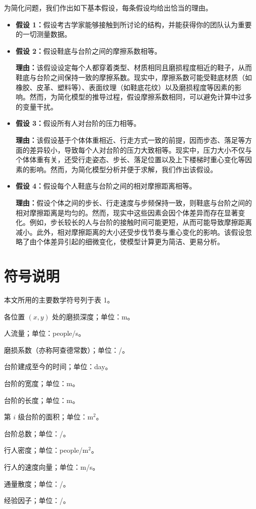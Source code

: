 \documentclass[11pt,a4paper]{ctexart}
\begin{document}
为简化问题，我们作出如下基本假设，每条假设均给出恰当的理由。

\begin{itemize}[leftmargin=2em,itemsep=4pt,topsep=2pt]
\item \textbf{假设 1：}假设考古学家能够接触到所讨论的结构，并能获得你的团队认为重要的一切测量数据。
\item \textbf{假设 2：}假设鞋底与台阶之间的摩擦系数相等。

\textbf{理由：}该假设设定每个人都穿着类型、材质相同且磨损程度相近的鞋子，从而鞋底与台阶之间保持一致的摩擦系数。现实中，摩擦系数可能受鞋底材质（如橡胶、皮革、塑料等）、表面纹理（如鞋底花纹）以及磨损程度等因素的影响。然而，为简化模型的推导过程，假设摩擦系数相同，可以避免计算中过多的变量干扰。

\item \textbf{假设 3：}假设所有人对台阶的压力相等。

\textbf{理由：}该假设基于个体体重相近、行走方式一致的前提，因而步态、落足等方面的差异较小，导致每个人对台阶的压力大致相等。现实中，压力大小不仅与个体体重有关，还受行走姿态、步长、落足位置以及上下楼梯时重心变化等因素的影响。然而，为简化模型分析并便于求解，我们作出该假设。

\item \textbf{假设 4：}假设每个人鞋底与台阶之间的相对摩擦距离相等。

\textbf{理由：}假设个体之间的步长、行走速度与步频保持一致，则鞋底与台阶之间的相对摩擦距离是均匀的。然而，现实中这些因素会因个体差异而存在显著变化。例如，步长较长的人与台阶的接触时间可能更短，从而可能导致摩擦距离减小。此外，相对摩擦距离的大小还受步伐节奏与重心变化的影响。该假设忽略了由个体差异引起的细微变化，使模型计算更为简洁、更易分析。
\end{itemize}

\section{符号说明}

本文所用的主要数学符号列于表 1。

\begingroup
\setlength{\itemsep}{2pt}
\begin{description}[leftmargin=3em,style=nextline]
\item[$d(x,y)$] 各位置 $(x,y)$ 处的磨损深度；单位：m。
\item[$N$] 人流量；单位：people/s。
\item[$k$] 磨损系数（亦称阿查德常数）；单位：/。
\item[$T$] 台阶建成至今的时间；单位：day。
\item[$W$] 台阶的宽度；单位：m。
\item[$L$] 台阶的长度；单位：m。
\item[$A_i$] 第 $i$ 级台阶的面积；单位：m$^2$。
\item[$n$] 台阶总数；单位：/。
\item[$\rho$] 行人密度；单位：people/m$^2$。
\item[$v$] 行人的速度向量；单位：m/s。
\item[$\nabla\cdot(\rho v)$] 通量散度；单位：/。
\item[$b$] 经验因子；单位：/。
\end{description}
\endgroup
\end{document}

